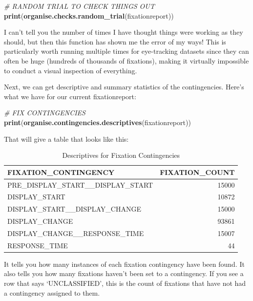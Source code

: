 \documentclass[]{book}
\newenvironment{Shaded}{\begin{snugshade}}{\end{snugshade}}
\newcommand{\CommentTok}[1]{\textcolor[rgb]{0.56,0.35,0.01}{\textit{#1}}}
\newcommand{\KeywordTok}[1]{\textcolor[rgb]{0.13,0.29,0.53}{\textbf{#1}}}
\newcommand{\NormalTok}[1]{#1}
\begin{document}
\begin{Shaded}
\begin{Highlighting}[]
\CommentTok{# RANDOM TRIAL TO CHECK THINGS OUT}
\KeywordTok{print}\NormalTok{(}\KeywordTok{organise.checks.random_trial}\NormalTok{(fixationreport))}
\end{Highlighting}
\end{Shaded}

I can't tell you the number of times I have thought things were working as they should, but then this function has shown me the error of my ways! This is particularly worth running multiple times for eye-tracking datasets since they can often be huge (hundreds of thousands of fixations), making it virtually impossible to conduct a visual inspection of everything.

Next, we can get descriptive and summary statistics of the contingencies. Here's what we have for our current fixationreport:

\begin{Shaded}
\begin{Highlighting}[]
\CommentTok{# FIX CONTINGENCIES}
\KeywordTok{print}\NormalTok{(}\KeywordTok{organise.contingencies.descriptives}\NormalTok{(fixationreport))}
\end{Highlighting}
\end{Shaded}

That will give a table that looks like this:

\begin{table}[t]

\caption{\label{tab:unnamed-chunk-35}Descriptives for Fixation Contingencies}
\centering
\fontsize{10}{12}\selectfont
\begin{tabular}{lr}
\toprule
FIXATION\_CONTINGENCY & FIXATION\_COUNT\\
\midrule
PRE\_DISPLAY\_START\_\_DISPLAY\_START & 15000\\
DISPLAY\_START & 10872\\
DISPLAY\_START\_\_DISPLAY\_CHANGE & 15000\\
DISPLAY\_CHANGE & 93861\\
DISPLAY\_CHANGE\_\_RESPONSE\_TIME & 15007\\
\addlinespace
RESPONSE\_TIME & 44\\
\bottomrule
\end{tabular}
\end{table}

It tells you how many instances of each fixation contingency have been found. It also tells you how many fixations haven't been set to a contingency. If you see a row that says `UNCLASSIFIED', this is the count of fixations that have not had a contingency assigned to them.
\end{document}

